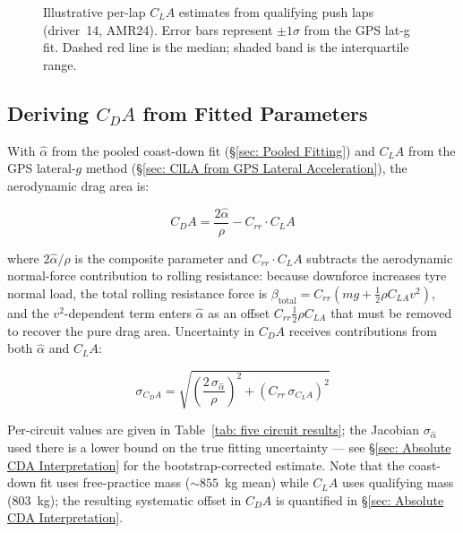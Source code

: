 \begin{figure}[h]
    \centering
    
    \caption[Per-lap CLA estimates from qualifying push laps (driver 14, AMR24). Error bars represent +-1 sigma from the GPS lat-g fit. Dashed red line is the median; shaded band is the interquartile range.]{Illustrative per-lap $C_LA$ estimates from qualifying push laps (driver~14, AMR24). Error bars represent $\pm1\sigma$ from the GPS lat-g fit. Dashed red line is the median; shaded band is the interquartile range.}
    \label{fig:cla_vs_lap}
\end{figure}

\subsection[Deriving CDA]{Deriving $C_DA$ from Fitted Parameters}
\label{sec: Deriving CDA}

With $\hat\alpha$ from the pooled coast-down fit (\S\ref{sec: Pooled Fitting}) and $C_LA$ from the GPS lateral-$g$ method (\S\ref{sec: ClLA from GPS Lateral Acceleration}), the aerodynamic drag area is:

\begin{equation}
    \label{eq: cda_identity}
    C_DA = \frac{2\hat\alpha}{\rho} - C_{rr} \cdot C_LA
\end{equation}

where $2\hat\alpha/\rho$ is the composite parameter and $C_{rr} \cdot C_LA$ subtracts the aerodynamic normal-force contribution to rolling resistance: because downforce increases tyre normal load, the total rolling resistance force is $\beta_\text{total} = C_{rr}(mg + \tfrac{1}{2}\rho C_{LA} v^2)$, and the $v^2$-dependent term enters $\hat\alpha$ as an offset $C_{rr}\tfrac{1}{2}\rho C_{LA}$ that must be removed to recover the pure drag area. Uncertainty in $C_DA$ receives contributions from both $\hat\alpha$ and $C_LA$:

\begin{equation}
    \label{eq: cda_uncertainty}
    \sigma_{C_DA} = \sqrt{\left(\frac{2\,\sigma_{\hat\alpha}}{\rho}\right)^2 + \left(C_{rr}\,\sigma_{C_LA}\right)^2}
\end{equation}

Per-circuit values are given in Table~\ref{tab: five circuit results}; the Jacobian $\sigma_{\hat\alpha}$ used there is a lower bound on the true fitting uncertainty --- see \S\ref{sec: Absolute CDA Interpretation} for the bootstrap-corrected estimate. Note that the coast-down fit uses free-practice mass ($\sim\!855$~kg mean) while $C_LA$ uses qualifying mass ($803$~kg); the resulting systematic offset in $C_DA$ is quantified in \S\ref{sec: Absolute CDA Interpretation}.

